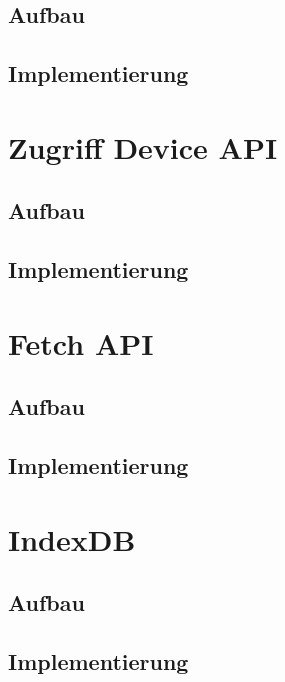 \subsection{Aufbau}
\subsection{Implementierung}



\section{Zugriff Device API}
\subsection{Aufbau}
\subsection{Implementierung}



\section{Fetch API}
\subsection{Aufbau}
\subsection{Implementierung}


\section{IndexDB}
\subsection{Aufbau}
\subsection{Implementierung}






